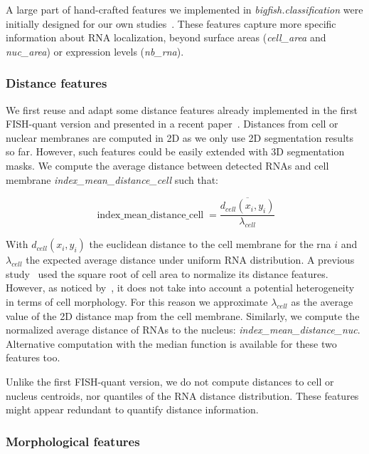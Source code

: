 A large part of hand-crafted features we implemented in \emph{bigfish.classification} were initially designed for our own studies~\cite{CHOUAIB_2020,safieddine_choreography_2021,pichon_kinesin_2021}.
These features capture more specific information about \ac{RNA} localization, beyond surface areas (\emph{cell\_area} and \emph{nuc\_area}) or expression levels (\emph{nb\_rna}).

\subsubsection{Distance features}

We first reuse and adapt some distance features already implemented in the first FISH-quant version and presented in a recent paper~\cite{samacoits_computational_2018}.
Distances from cell or nuclear membranes are computed in 2D as we only use 2D segmentation results so far.
However, such features could be easily extended with 3D segmentation masks.
We compute the average distance between detected \ac{RNA}s and cell membrane \emph{index\_mean\_distance\_cell} such that:

\begin{equation}
	{\displaystyle \operatorname{index\_mean\_distance\_cell} = \frac{\overline{d_{cell}(x_i, y_i)}}{\lambda_{cell}}}
\end{equation}

\noindent
With $d_{cell}(x_i, y_i)$ the euclidean distance to the cell membrane for the rna $i$ and $\lambda_{cell}$ the expected average distance under uniform \ac{RNA} distribution.
A previous study~\cite{battich_control_2015} used the square root of cell area to normalize its distance features.
However, as noticed by~\cite{samacoits_computational_2018}, it does not take into account a potential heterogeneity in terms of cell morphology.
For this reason we approximate $\lambda_{cell}$ as the average value of the 2D distance map from the cell membrane.
Similarly, we compute the normalized average distance of \ac{RNA}s to the nucleus: \emph{index\_mean\_distance\_nuc}.
Alternative computation with the median function is available for these two features too.

Unlike the first FISH-quant version, we do not compute distances to cell or nucleus centroids, nor quantiles of the \ac{RNA} distance distribution.
These features might appear redundant to quantify distance information.

\subsubsection{Morphological features}

